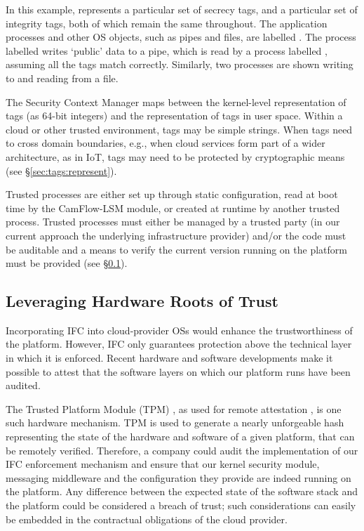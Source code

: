 \documentclass[10pt,journal,compsoc]{IEEEtran}
\begin{document}
In this example,  represents a particular set of secrecy tags, and   a particular set of integrity tags, both of which remain the same throughout. 
The application processes and other OS objects, such as pipes and files, are labelled . The process labelled  writes `public' data to a pipe, which is read by a process labelled , assuming all the  tags match correctly. 
Similarly, two processes are shown writing to and reading from a file.


The Security Context Manager maps between the kernel-level representation of tags (as 64-bit integers) and the representation of tags in user space. 
Within a cloud or other trusted environment, tags may be simple strings. When tags need to cross domain boundaries, e.g., when cloud services form part of a wider architecture, as in IoT, tags may need to be protected by cryptographic means (see \S\ref{sec:tags:represent}).

Trusted processes are either set up through static configuration, read at boot time by the CamFlow-LSM module, or created at runtime by another trusted process.
Trusted processes must either be managed by a trusted party (in our current approach the underlying infrastructure provider) and\slash or the code must be auditable and a means to verify the current version running on the platform must be provided (see \S\ref{sec:os:hardware}).







\subsection{Leveraging Hardware Roots of Trust}
\label{sec:os:hardware}

Incorporating IFC into cloud-provider OSs would enhance the trustworthiness of the platform. However, IFC only guarantees protection above the technical layer in which it is enforced. 
Recent hardware and software developments make it possible to attest that the software layers on which our platform runs have been audited.

The Trusted Platform Module (TPM) \cite{parno2008bootstrapping}, as used for remote attestation \cite{santos2009towards}, is one such hardware mechanism. 
TPM is used to generate a nearly unforgeable hash representing the state of the hardware and software of a given platform, that can be remotely verified.
Therefore, a company could audit the implementation of our IFC enforcement mechanism and ensure that our kernel security module, messaging middleware and the configuration they provide are indeed running on the platform. 
Any difference between the expected state of the software stack and the platform could be considered a breach of trust; such considerations can easily be embedded in the contractual obligations of the cloud provider.
\end{document}
